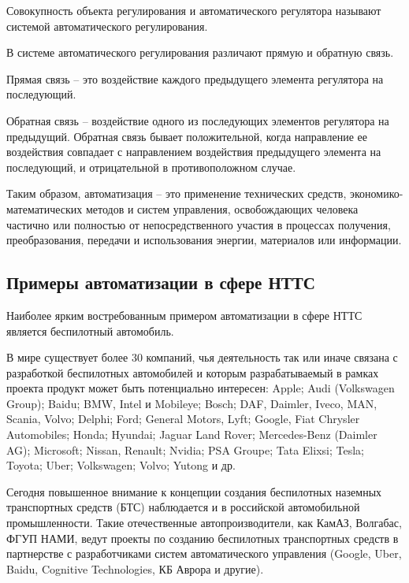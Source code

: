 Совокупность объекта регулирования и автоматического регулятора называют системой автоматического регулирования.

В системе автоматического регулирования различают прямую и обратную связь.

Прямая связь -- это воздействие каждого предыдущего элемента регулятора на последующий.

Обратная связь -- воздействие одного из последующих элементов регулятора на предыдущий. Обратная связь бывает положительной, когда направление ее воздействия совпадает с направлением воздействия предыдущего элемента на последующий, и отрицательной в противоположном случае.

Таким образом, автоматизация -- это применение технических средств, экономико-математических методов и систем управления, освобождающих человека частично или полностью от непосредственного участия в процессах получения, преобразования, передачи и использования энергии, материалов или информации.

\subsection{Примеры автоматизации в сфере НТТС}\label{subsec:ch1/sec1/sub3}

Наиболее ярким востребованным примером автоматизации в сфере НТТС является беспилотный автомобиль.

В мире существует более 30 компаний, чья деятельность так или иначе связана с разработкой беспилотных автомобилей и которым разрабатываемый в рамках проекта продукт может быть потенциально интересен: Apple; Audi (Volkswagen Group); Baidu; BMW, Intel и Mobileye; Bosch; DAF, Daimler, Iveco, MAN, Scania, Volvo; Delphi; Ford; General Motors, Lyft; Google, Fiat Chrysler Automobiles; Honda; Hyundai; Jaguar Land Rover; Mercedes-Benz (Daimler AG); Microsoft; Nissan, Renault; Nvidia; PSA Groupe; Tata Elixsi; Tesla; Toyota; Uber; Volkswagen; Volvo; Yutong и др.

Сегодня повышенное внимание к концепции создания беспилотных наземных транспортных средств (БТС) наблюдается и в российской автомобильной промышленности. Такие отечественные автопроизводители, как КамАЗ, Волгабас, ФГУП НАМИ, ведут проекты по созданию беспилотных транспортных средств в партнерстве с разработчиками систем автоматического управления (Google, Uber, Baidu, Cognitive Technologies, КБ Аврора и другие).

